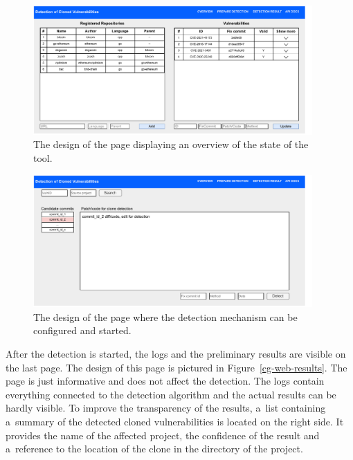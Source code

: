   \begin{figure}[h]
    \centering
    \includegraphics[width=0.95\textwidth]{obrazky-figures/cg_web_overview.drawio.pdf}
    \caption{The design of the page displaying an overview of the state of the tool.}
    \label{cg-web-overview}
  \end{figure}

  \begin{figure}[h]
    \centering
    \includegraphics[width=0.95\textwidth]{obrazky-figures/cg_web_search.drawio.pdf}
    \caption{The design of the page where the detection mechanism can be configured and started.}
    \label{cg-web-search}
  \end{figure}

  After the detection is started, the logs and the preliminary results are visible on the last page. The design of this
  page is pictured in Figure~\ref{cg-web-results}. The page is just informative and does not affect the detection.
  The logs contain everything connected to the detection algorithm and the actual results can be hardly visible. To improve the transparency of the results,
   a~list containing a~summary of the detected cloned vulnerabilities is located on the right side. It provides the name of
  the affected project, the confidence of the result and a~reference to the location of the clone in the directory of the project.

